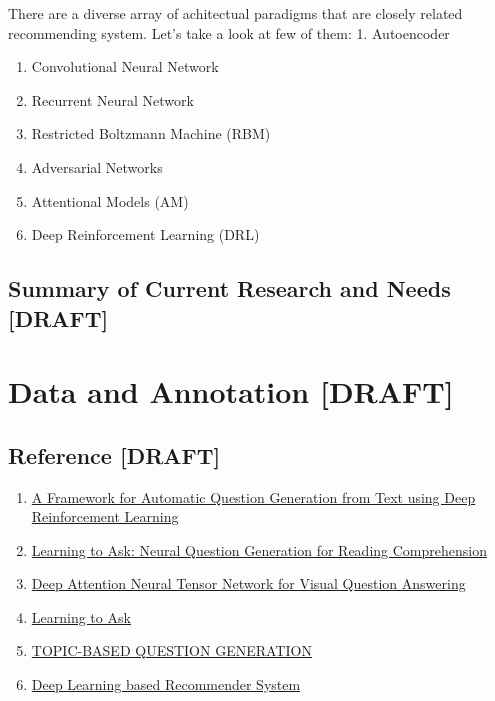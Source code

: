 \documentclass[]{book}
\theoremstyle{definition}
\theoremstyle{definition}
\theoremstyle{definition}
\theoremstyle{remark}
\begin{document}
There are a diverse array of achitectual paradigms that are closely
related recommending system. Let's take a look at few of them: 1.
Autoencoder

\begin{enumerate}
\def\labelenumi{\arabic{enumi}.}
\setcounter{enumi}{1}
\item
  Convolutional Neural Network
\item
  Recurrent Neural Network
\item
  Restricted Boltzmann Machine (RBM)
\item
  Adversarial Networks
\item
  Attentional Models (AM)
\item
  Deep Reinforcement Learning (DRL)
\end{enumerate}

\subsection{Summary of Current Research and Needs
{[}DRAFT{]}}\label{summary-of-current-research-and-needs-draft}

\section{Data and Annotation
{[}DRAFT{]}}\label{data-and-annotation-draft}

\subsection{Reference {[}DRAFT{]}}\label{reference-draft}

\begin{enumerate}
\def\labelenumi{\arabic{enumi}.}
\item
  \href{https://arxiv.org/pdf/1808.04961.pdf}{A Framework for Automatic
  Question Generation from Text using Deep Reinforcement Learning}
\item
  \href{https://arxiv.org/pdf/1705.00106.pdf}{Learning to Ask: Neural
  Question Generation for Reading Comprehension}
\item
  \href{http://openaccess.thecvf.com/content_ECCV_2018/papers/Yalong_Bai_Deep_Attention_Neural_ECCV_2018_paper.pdf}{Deep
  Attention Neural Tensor Network for Visual Question Answering}
\item
  \href{http://www.cs.cornell.edu/~xdu/papers/acl17_dsc_poster.pdf}{Learning
  to Ask}
\item
  \href{https://openreview.net/pdf?id=rk3pnae0b}{TOPIC-BASED QUESTION
  GENERATION}
\item
  \href{https://arxiv.org/pdf/1707.07435.pdf}{Deep Learning based
  Recommender System}
\end{enumerate}
\end{document}
